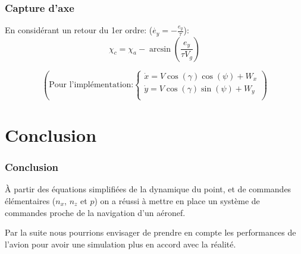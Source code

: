 \documentclass[tikz, footheight=2em]{beamer}
\begin{document}
\begin{frame}
    \frametitle{Capture d'axe} \pause{}
    En considérant un retour du 1er ordre: (\( \dot{e_y} = -\frac{e_y}{\tau} \)):
    \pause{}
    \[
    \boxed{
        \chi_c = \chi_a - \arcsin (\frac{e_y}{\tau V_g})
    }
    \] \pause{}

    \[
    \left(
        \text{Pour l'implémentation:}
        \left \{
        \begin{array}{l}
            \dot{x} = V \cos (\gamma) \cos (\psi) + W_x \\
            \dot{y} = V \cos (\gamma) \sin (\psi) + W_y \\
        \end{array}
        \right.
    \right)
    \]
\end{frame}

\section{Conclusion}

\begin{frame}
    \frametitle{Conclusion} \pause{}

    \begin{center}
        À partir des équations simplifiées de la dynamique du point, et
        de commandes élémentaires (\( n_x \), \( n_z \) et \( p \)) on
        a réussi à mettre en place un système de commandes proche de
        la navigation d'un aéronef.
    \end{center}
\begin{center}
    Par la suite nous pourrions envisager de prendre en compte
    les performances de l'avion pour avoir une simulation plus
    en accord avec la réalité.

\end{center}

\end{frame}
\end{document}
